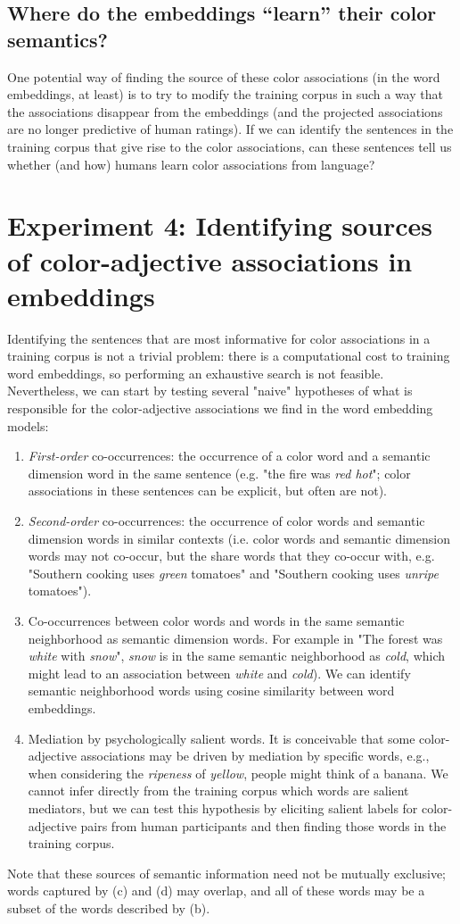 \documentclass[10pt,letterpaper]{article}
\begin{document}
\subsection{Where do the embeddings ``learn'' their color semantics?}
One potential way of finding the source of these color associations (in the word embeddings, at least) is to try to modify the training corpus in such a way that the associations disappear from the embeddings (and the projected associations are no longer predictive of human ratings). If we can identify the sentences in the training corpus that give rise to the color associations, can these sentences tell us whether (and how) humans learn color associations from language?

\section{Experiment 4: Identifying sources of color-adjective associations in embeddings}
Identifying the sentences that are most informative for color associations in a training corpus is not a trivial problem: there is a computational cost to training word embeddings, so performing an exhaustive search is not feasible. Nevertheless, we can start by testing several "naive" hypotheses of what is responsible for the color-adjective associations we find in the word embedding models: 
\begin{enumerate}[label=(\alph*)]
\item \emph{First-order} co-occurrences: the occurrence of a color word and a semantic dimension word in the same sentence (e.g. "the fire was \emph{red hot}"; color associations in these sentences can be explicit, but often are not).
\item \emph{Second-order} co-occurrences: the occurrence of color words and semantic dimension words in similar contexts (i.e. color words and semantic dimension words may not co-occur, but the share words that they co-occur with, e.g. "Southern cooking uses \emph{green} tomatoes" and "Southern cooking uses \emph{unripe} tomatoes").
\item Co-occurrences between color words and words in the same semantic neighborhood as semantic dimension words. For example in "The forest was \emph{white} with \emph{snow}", \emph{snow} is in the same semantic neighborhood as \emph{cold}, which might lead to an association between \emph{white} and \emph{cold}). We can identify semantic neighborhood words using cosine similarity between word embeddings.
\item Mediation by psychologically salient words. It is conceivable that some color-adjective associations may be driven by mediation by specific words, e.g., when considering the \emph{ripeness} of \emph{yellow}, people might think of a banana. We cannot infer directly from the training corpus which words are salient mediators, but we can test this hypothesis by eliciting salient labels for color-adjective pairs from human participants and then finding those words in the training corpus.
\end{enumerate}
Note that these sources of semantic information need not be mutually exclusive; words captured by (c) and (d) may overlap, and all of these words may be a subset of the words described by (b).
\end{document}

